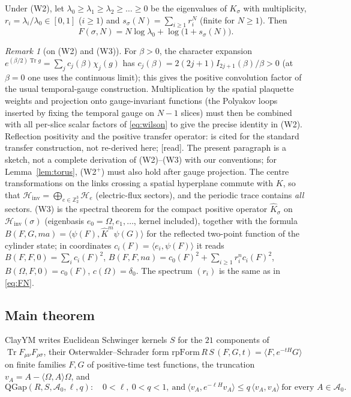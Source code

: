 \documentclass[11pt,a4paper]{article}
\theoremstyle{plain}
\theoremstyle{definition}
\theoremstyle{remark}
\newtheorem{remark}[theorem]{Remark}
\numberwithin{equation}{section}
\newcommand{\Z}{\mathbb{Z}}
\newcommand{\Tr}{\operatorname{Tr}}
\newcommand{\Hinv}{\mathcal{H}_{\mathrm{inv}}}
\newcommand{\Kh}{\widehat K}
\newcommand{\st}[1]{\textsf{[#1]}}
\newcommand{\cA}{\mathcal{A}}
\begin{document}
Under (W2), let $\lambda_0\ge\lambda_1\ge\lambda_2\ge\dots\ge0$ be the eigenvalues of $K_\sigma$ with multiplicity, $r_i=\lambda_i/\lambda_0\in[0,1]$
($i\ge1$) and $s_\sigma(N)=\sum_{i\ge1}r_i^N$ (finite for $N\ge1$). Then
\begin{equation}\label{eq:FN}
F(\sigma,N)=N\log\lambda_0+\log\bigl(1+s_\sigma(N)\bigr).
\end{equation}

\begin{remark}[on (W2) and (W3)]\label{rem:W2}
For $\beta>0$, the character expansion $e^{(\beta/2)\Tr g}=\sum_jc_j(\beta)\chi_j(g)$ has $c_j(\beta)=2(2j+1)I_{2j+1}(\beta)/\beta>0$ (at
$\beta=0$ one uses the continuous limit); this gives the positive convolution factor of the usual temporal-gauge construction. Multiplication
by the spatial plaquette weights and projection onto gauge-invariant functions (the Polyakov loops inserted by fixing the temporal gauge on
$N-1$ slices) must then be combined with all per-slice scalar factors of \eqref{eq:wilson} to give the precise identity in (W2). Reflection
positivity and the positive transfer operator: \cite{Lus77} is cited for the standard transfer construction, not re-derived here; \cite[\S2.3]{OS78} \st{read}. The present paragraph is a sketch, not a
complete derivation of (W2)--(W3) with our conventions; for Lemma~\ref{lem:torus}, (W2$^+$) must also hold after gauge projection.
The centre transformations on the links crossing a spatial hyperplane commute with $K$, so that $\Hinv=\bigoplus_{e\in\Z_2^3}\mathcal
H_e$ (electric-flux sectors), and the periodic trace contains \emph{all} sectors. (W3) is the spectral theorem for the compact positive
operator $\Kh_\sigma$ on $\Hinv(\sigma)$ (eigenbasis $e_0=\Omega,e_1,\dots$, kernel included), together with the formula
$B(F,G,ma)=\langle\psi(F),\Kh^m\psi(G)\rangle$ for the reflected two-point function of the cylinder state; in coordinates
$c_i(F)=\langle e_i,\psi(F)\rangle$ it reads $B(F,F,0)=\sum_ic_i(F)^2$, $B(F,F,na)=c_0(F)^2+\sum_{i\ge1}r_i^nc_i(F)^2$, $B(\Omega,F,0)=c_0(F)$,
$c(\Omega)=\delta_0$. The spectrum $(r_i)$ is the same as in \eqref{eq:FN}.
\end{remark}

\subsection{Main theorem}
ClayYM \cite{ClayYM} writes Euclidean Schwinger kernels $S$ for the $21$ components of $\Tr F_{\mu\nu}F_{\rho\sigma}$, their
Osterwalder--Schrader form $\mathrm{rpForm}\,R\,S\,(F,G,t)=\langle F,e^{-tH}G\rangle$ on finite families $F,G$ of positive-time test
functions, the truncation $v_A=A-\langle\Omega,A\rangle\Omega$, and
\begin{equation}\label{eq:qgap}
\mathrm{QGap}(R,S,\cA_0,\ell,q):\quad 0<\ell,\ 0<q<1,\ \text{and}\ \langle v_A,e^{-\ell H}v_A\rangle\le q\,\langle v_A,v_A\rangle\ \text{for every }A\in\cA_0.
\end{equation}
\end{document}
